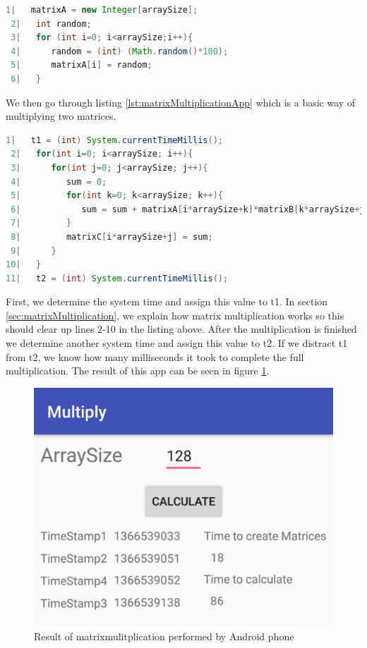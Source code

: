 \documentclass[a4paper, 11pt]{report}
\begin{document}
\begin{lstlisting}[caption={Creating matrix},captionpos=b, label={lst:createMatrix}, language=java, float=h]
 1|   matrixA = new Integer[arraySize];
 2|   int random;
 3|   for (int i=0; i<arraySize;i++){
 4|      random = (int) (Math.random()*100);
 5|      matrixA[i] = random;
 6|   }
\end{lstlisting}
We then go through listing \ref{lst:matrixMultiplicationApp} which is a basic way of multiplying two matrices.
\begin{lstlisting}[caption={Code for matrix multiplication on Android phone},captionpos=b, label={lst:matrixMultiplicationApp}, language=java, float=h]
 1|   t1 = (int) System.currentTimeMillis();
 2|   for(int i=0; i<arraySize; i++){
 3|      for(int j=0; j<arraySize; j++){
 4|         sum = 0;
 5|         for(int k=0; k<arraySize; k++){
 6|            sum = sum + matrixA[i*arraySize+k]*matrixB[k*arraySize+j];
 7|         }
 8|         matrixC[i*arraySize+j] = sum;
 9|      }
10|   }
11|   t2 = (int) System.currentTimeMillis();
\end{lstlisting}

First, we determine the system time and assign this value to t1. In section \ref{sec:matrixMultiplication}, we explain how matrix multiplication works so this should clear up lines 2-10 in the listing above. After the multiplication is finished we determine another system time and assign this value to t2. If we distract t1 from t2, we know how many milliseconds it took to complete the full multiplication. The result of this app can be seen in figure \ref{fig:resultApp1}.

\begin{figure}[ht]
\centering
\includegraphics[scale=0.2]{images/MultiplyApp.pdf}
\caption{Result of matrixmulitplication performed by Android phone}\label{fig:resultApp1}
\end{figure}
\end{document}
